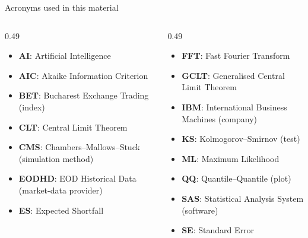 {
\begin{frame}[noframenumbering]
    \titlepage
\end{frame}
}
\begin{frame}{Acronyms used in this material}
\begin{columns}[T]
\begin{column}{0.49\textwidth}
\begin{itemize}\setlength{\itemsep}{0pt}
    \item \textbf{AI}: Artificial Intelligence
    \item \textbf{AIC}: Akaike Information Criterion
    \item \textbf{BET}: Bucharest Exchange Trading (index)
    \item \textbf{CLT}: Central Limit Theorem
    \item \textbf{CMS}: Chambers–Mallows–Stuck (simulation method)
    \item \textbf{EODHD}: EOD Historical Data (market-data provider)
    \item \textbf{ES}: Expected Shortfall
\end{itemize}
\end{column}
\begin{column}{0.49\textwidth}
\begin{itemize}\setlength{\itemsep}{0pt}
    \item \textbf{FFT}: Fast Fourier Transform
    \item \textbf{GCLT}: Generalised Central Limit Theorem
    \item \textbf{IBM}: International Business Machines (company)
    \item \textbf{KS}: Kolmogorov–Smirnov (test)
    \item \textbf{ML}: Maximum Likelihood
    \item \textbf{QQ}: Quantile–Quantile (plot)
    \item \textbf{SAS}: Statistical Analysis System (software)
    \item \textbf{SE}: Standard Error
\end{itemize}
\end{column}
\end{columns}
\end{frame}

